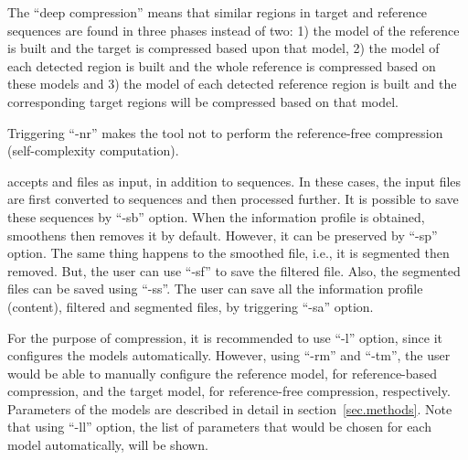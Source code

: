 The ``deep compression'' means that similar regions in target and reference sequences are found in three phases instead of two: 1) the model of the reference is built and the target is compressed based upon that model, 2) the model of each detected region is built and the whole reference is compressed based on these models and 3) the model of each detected reference region is built and the corresponding target regions will be compressed based on that model.

Triggering ``-nr'' makes the tool not to perform the reference-free compression (self-complexity computation).

\smashpp accepts \fasta and \fastq files as input, in addition to sequences. In these cases, the input files are first converted to sequences and then processed further. It is possible to save these sequences by ``-sb'' option.
When the information profile is obtained, \smashpp smoothens then removes it by default. However, it can be preserved by ``-sp'' option.
The same thing happens to the smoothed file, i.e., it is segmented then removed. But, the user can use ``-sf'' to save the filtered file. 
Also, the segmented files can be saved using ``-ss''. 
The user can save all the information profile (content), filtered and segmented files, by triggering ``-sa'' option.

For the purpose of compression, it is recommended to use ``-l'' option, since it configures the models automatically. However, using ``-rm'' and ``-tm'', the user would be able to manually configure the reference model, for reference-based compression, and the target model, for reference-free compression, respectively. Parameters of the models are described in detail in section~\ref{sec.methods}.
Note that using ``-ll'' option, the list of parameters that would be chosen for each model automatically, will be shown.

